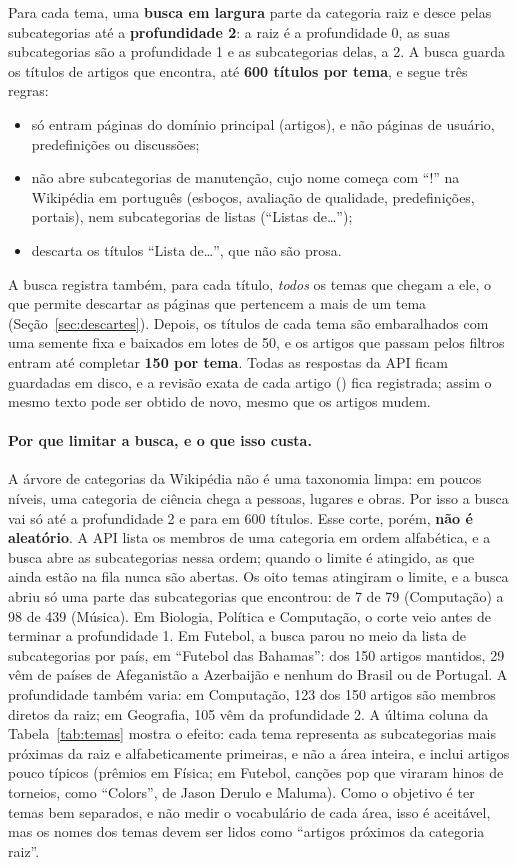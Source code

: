 Para cada tema, uma \textbf{busca em largura} parte da categoria raiz e desce pelas
subcategorias até a \textbf{profundidade 2}: a raiz é a profundidade 0, as suas subcategorias
são a profundidade 1 e as subcategorias delas, a 2. A busca guarda os títulos de artigos que
encontra, até \textbf{600 títulos por tema}, e segue três regras:
\begin{itemize}
    \item só entram páginas do domínio principal (artigos), e não páginas de usuário,
    predefinições ou discussões;
    \item não abre subcategorias de manutenção, cujo nome começa com ``!'' na Wikipédia em
    português (esboços, avaliação de qualidade, predefinições, portais), nem subcategorias de
    listas (``Listas de\ldots'');
    \item descarta os títulos ``Lista de\ldots'', que não são prosa.
\end{itemize}
A busca registra também, para cada título, \emph{todos} os temas que chegam a ele, o que
permite descartar as páginas que pertencem a mais de um tema (Seção~\ref{sec:descartes}).
Depois, os títulos de cada tema são embaralhados com uma semente fixa e baixados em lotes de
50, e os artigos que passam pelos filtros entram até completar \textbf{150 por tema}. Todas as
respostas da API ficam guardadas em disco, e a revisão exata de cada artigo () fica
registrada; assim o mesmo texto pode ser obtido de novo, mesmo que os artigos mudem.

\paragraph{Por que limitar a busca, e o que isso custa.} A árvore de categorias da Wikipédia
não é uma taxonomia limpa: em poucos níveis, uma categoria de ciência chega a pessoas, lugares
e obras. Por isso a busca vai só até a profundidade 2 e para em 600 títulos. Esse corte, porém,
\textbf{não é aleatório}. A API lista os membros de uma categoria em ordem alfabética, e a busca
abre as subcategorias nessa ordem; quando o limite é atingido, as que ainda estão na fila nunca
são abertas. Os oito temas atingiram o limite, e a busca abriu só uma parte das subcategorias
que encontrou: de 7 de 79 (Computação) a 98 de 439 (Música). Em Biologia, Política e
Computação, o corte veio antes de terminar a profundidade 1. Em Futebol, a busca parou no meio
da lista de subcategorias por país, em ``Futebol das Bahamas'': dos 150 artigos mantidos, 29
vêm de países de Afeganistão a Azerbaijão e nenhum do Brasil ou de Portugal. A profundidade
também varia: em Computação, 123 dos 150 artigos são membros diretos da raiz; em Geografia,
105 vêm da profundidade 2. A última coluna da Tabela~\ref{tab:temas} mostra o efeito: cada tema
representa as subcategorias mais próximas da raiz e alfabeticamente primeiras, e não a área
inteira, e inclui artigos pouco típicos (prêmios em Física; em Futebol, canções pop que
viraram hinos de torneios, como ``Colors'', de Jason Derulo e Maluma). Como o objetivo é ter temas bem separados, e não medir o vocabulário de cada
área, isso é aceitável, mas os nomes dos temas devem ser lidos como ``artigos próximos da
categoria raiz''.

